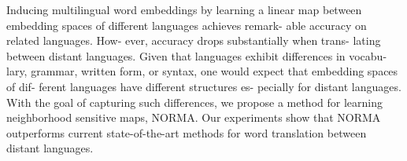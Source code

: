 Inducing multilingual word embeddings by learning a linear map between embedding spaces of different languages achieves remark- able accuracy on related languages. How- ever, accuracy drops substantially when trans- lating between distant languages. Given that languages exhibit differences in vocabu- lary, grammar, written form, or syntax, one would expect that embedding spaces of dif- ferent languages have different structures es- pecially for distant languages. With the goal of capturing such differences, we propose a method for learning neighborhood sensitive maps, NORMA. Our experiments show that NORMA outperforms current state-of-the-art methods for word translation between distant languages.
